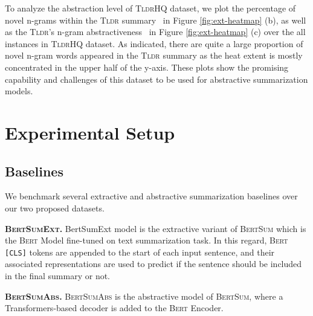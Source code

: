 \documentclass[11pt]{article}
\newcommand{\tldrs}{\textsc{TldrHQ}}
\newcommand{\tldr}{\textsc{Tldr}}
\begin{document}
To analyze the abstraction level of \tldrs{} dataset, we plot the percentage of novel n-grams within the \tldr{} summary~\cite{See2017GetTT} in Figure \ref{fig:ext-heatmap} (b), as well as the \tldr 's n-gram abstractiveness~\cite{Gehrmann2019GeneratingAS} in Figure \ref{fig:ext-heatmap} (c) over the all instances in \tldrs{} dataset. As indicated, there are quite a large proportion of novel n-gram words appeared in the \tldr{} summary as the heat extent is mostly concentrated in the upper half of the y-axis. These plots show the promising capability and challenges of this dataset to be used for abstractive summarization models.







 

\section{Experimental Setup}
\subsection{Baselines}
We benchmark several extractive and abstractive summarization baselines over our two proposed datasets. 

\noindent \textbf{\textsc{BertSumExt.} }\cite{Liu2019TextSW} BertSumExt model is the extractive variant of \textsc{BertSum} which is the \textsc{Bert} Model fine-tuned on text summarization task. In this regard, \textsc{Bert} \texttt{[CLS]} tokens are appended to the start of each input sentence, and their associated representations are used to predict if the sentence should be included in the final summary or not. 






















\noindent \textbf{\textsc{BertSumAbs.} }\cite{Lewis2020BARTDS} \textsc{BertSumAbs} is the abstractive model of \textsc{BertSum}, where a Transformers-based decoder is added to the \textsc{Bert} Encoder. 
\end{document}
